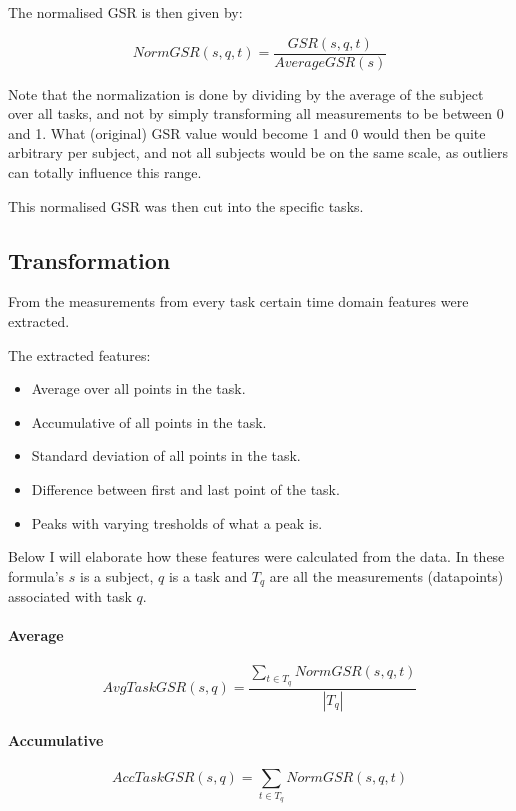 \documentclass[11pt,leqno,a4paper]{report} %
\begin{document}
The normalised GSR is then given by:

\[
NormGSR(s,q,t) = \frac{GSR(s,q,t)}{AverageGSR(s)}
\]

Note that the normalization is done by dividing by the average of the subject over all tasks, and not by simply transforming all measurements to be between 0 and 1. What (original) GSR value would become 1 and 0 would then be quite arbitrary per subject, and not all subjects would be on the same scale, as outliers can totally influence this range.

This normalised GSR was then cut into the specific tasks.

\subsection{Transformation}
From the measurements from every task certain time domain features were extracted. 

The extracted features:

\begin{itemize}

\item Average over all points in the task.
\item Accumulative of all points in the task.
\item Standard deviation of all points in the task.
\item Difference between first and last point of the task.
\item Peaks with varying tresholds of what a peak is.
\end{itemize}

Below I will elaborate how these features were calculated from the data. In these formula's $s$ is a subject, $q$ is a task and $T_q$ are all the measurements (datapoints) associated with task $q$.

\paragraph{Average}

\[
AvgTaskGSR(s,q) = \frac { \sum_{t \in T_q} NormGSR(s,q,t) }
{\left\vert{T_q}\right\vert }
\]

\paragraph{Accumulative}

\[
AccTaskGSR(s,q) =  \sum_{t \in T_q} NormGSR(s,q,t)
\]
\end{document}
